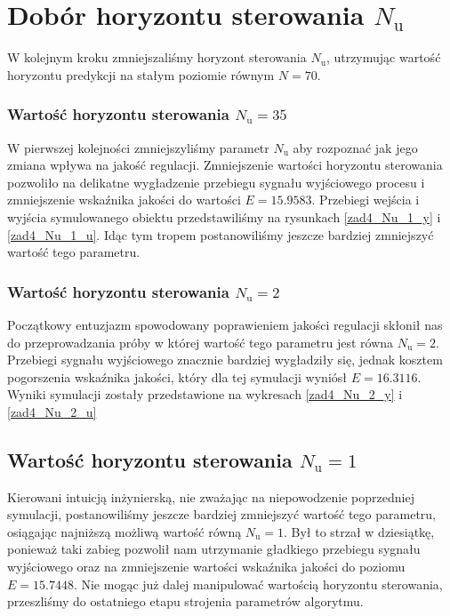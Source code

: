 \section{Dobór horyzontu sterowania $N_{\mathrm{u}}$}
W kolejnym kroku zmniejszaliśmy horyzont sterowania $N_{\mathrm{u}}$, utrzymując wartość
horyzontu predykcji na stałym poziomie równym $N = \num{70}$.

\subsubsection{Wartość horyzontu sterowania $N_{\mathrm{u}} = 35$}
W pierwszej kolejności zmniejszyliśmy parametr $N_{\mathrm{u}}$ aby rozpoznać jak jego zmiana
wpływa na jakość regulacji. Zmniejszenie wartości horyzontu sterowania pozwoliło na
delikatne wygładzenie przebiegu sygnału wyjściowego procesu i zmniejszenie wskaźnika jakości
do wartości $E=\num{15,9583}$. Przebiegi wejścia i wyjścia symulowanego obiektu przedstawiliśmy 
na rysunkach \ref{zad4_Nu_1_y} i \ref{zad4_Nu_1_u}. Idąc tym tropem postanowiliśmy jeszcze bardziej zmniejszyć
wartość tego parametru.

\subsubsection{Wartość horyzontu sterowania $N_{\mathrm{u}} = 2$}
Początkowy entuzjazm spowodowany poprawieniem jakości regulacji skłonił nas do przeprowadzania
próby w której wartość tego parametru jest równa $N_{\mathrm{u}} = 2$. Przebiegi sygnału 
wyjściowego znacznie bardziej wygładziły się, jednak kosztem pogorszenia wskaźnika jakości, 
który dla tej symulacji wyniósł $E = \num{16,3116}$. Wyniki symulacji zostały przedstawione 
na wykresach \ref{zad4_Nu_2_y} i \ref{zad4_Nu_2_u}

\subsection{Wartość horyzontu sterowania $N_{\mathrm{u}} = 1$}
Kierowani intuicją inżynierską, nie zważając na niepowodzenie poprzedniej symulacji, postanowiliśmy
jeszcze bardziej zmniejszyć wartość tego parametru, osiągając najniższą możliwą wartość równą 
$N_{\mathrm{u}} = 1$. Był to strzał w dziesiątkę, ponieważ taki zabieg pozwolił nam utrzymanie
gładkiego przebiegu sygnału wyjściowego oraz na zmniejszenie wartości wskaźnika jakości do poziomu
$E = \num{15,7448}$. Nie mogąc już dalej manipulować wartością horyzontu sterowania, przeszliśmy do 
ostatniego etapu strojenia parametrów algorytmu.

